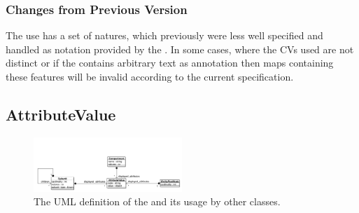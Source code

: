 


\subsubsection{Changes from Previous Version}

The use  has a set of natures, which previously
were less well specified and handled as notation provided by the
.  In some cases, where the CVs used are
not distinct or if the  contains arbitrary
text as annotation then maps containing these features will be invalid
according to the current specification.

\subsection{AttributeValue}
\label{defn:AttributeValue}

\begin{figure}[htb]
  \centering
  \includegraphics[width = 0.5\textwidth]{images/attributevalueuml}
  \caption{The UML definition of the  and
    its usage by other classes.}
  \label{fig:attributevalueuml}
\end{figure}

